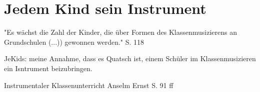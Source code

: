 \section{Jedem Kind sein Instrument}


"Es wächst die Zahl der Kinder, die über Formen des Klassenmusizierens an
Grundschulen (...)) gewonnen werden." S. 118 

JeKids: meine Annahme, dass es Quatsch ist, einem Schüler im Klassenmusizieren
ein Isntrument beizubringen.

Instrumentaler Klassenunterricht
Anselm Ernst S. 91 ff
